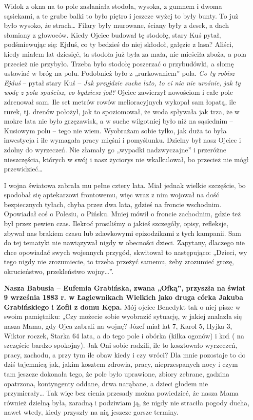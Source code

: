 Widok z okna na to pole zasłaniała stodoła, wysoka, z gumnem i dwoma sąsiekami, a te grube balki to było piętro i jeszcze wyżej to były bunty. To już było wysoko, że strach… Filary były murowane, ściany były z desek, a dach słomiany z głowoców. Kiedy Ojciec budował tę stodołę, stary Kuś pytał, podśmiewując się: Ejduś, co ty bedzieś do niej skłodoł, gałęzie z lasa? Aliści, kiedy miałem lat dziesięć, ta stodoła już była za mała, nie mieściła zboża, a pola przecież nie przybyło. Trzeba było stodołę poszerzać o przybudówki, a słomę ustawiać w bróg na polu. Podobnież było z „rurkowaniem” pola. \textit{Co ty robisz Ejduś} -- pytał stary Kuś – \textit{Jak przyjdzie suche lato, to ci nic nie urośnie, jak ty wodę z pola spuścisz, co bydziesz jod?} Ojciec zawierzył nowościom i całe pole zdrenował sam. Ile set metrów rowów melioracyjnych wykopał sam łopatą, ile rurek, tj. drenów położył, jak to spoziomował, że woda spływała jak trza, że w mokre lata nie było grzęzawisk, a w suche wilgotniej było niż na sąsiednim – Kusiowym polu – tego nie wiem. Wyobrażam sobie tylko, jak duża to była inwestycja i ile wymagała pracy mięśni i pomyślunku. Dzielny był nasz Ojciec i zdolny do wyrzeczeń. Nie złamały go „wypadki nadzwyczajne” i przeróżne nieszczęścia, których w swój i nasz życiorys nie wkalkulował, bo przecież nie mógł przewidzieć…

I wojna światowa zabrała mu pełne cztery lata. Miał jednak wielkie szczęście, bo spodobał się aptekarzowi frontowemu, więc wraz z nim wojował na dość bezpiecznych tyłach, chyba przez dwa lata, gdzieś na froncie wschodnim. Opowiadał coś o Polesiu, o Pińsku. Mniej mówił o froncie zachodnim, gdzie też był przez pewien czas. Ilekroć prosiliśmy o jakieś szczegóły, opisy, refleksje, zbywał nas brakiem czasu lub zdawkowymi epizodzikami z tych kampanii. Sam do tej tematyki nie nawiązywał nigdy w obecności dzieci. Zapytany, dlaczego nie chce opowiadać swych wojennych przygód, skwitował to następująco: „Dzieci, wy tego nigdy nie zrozumiecie, to trzeba przeżyć samemu, żeby zrozumieć grozę, okrucieństwo, przekleństwo wojny…”. 

\textbf{Nasza Babusia – Eufemia Grabińska, zwana „Ofką”, przyszła na świat 9 września 1883 r. w Łagiewnikach Wielkich jako druga córka Jakuba Grabińskiego i Zofii z domu Kępa.} Mój ojciec Benedykt tak o niej pisze w swoim pamiętniku: „Czy możecie sobie wyobrazić sytuację, w jakiej znalazła się nasza Mama, gdy Ojca zabrali na wojnę? Józef miał lat 7, Karol 5, Hyjka 3, Wiktor roczek, Starka 64 lata, a do tego pole i obórka (kilka ogonów) i koń ( na szczęście bardzo spokojny). Jak Oni sobie radzili, ile to kosztowało wyrzeczeń, pracy, zachodu, a przy tym ile obaw kiedy i czy wróci? Dla mnie pozostaje to do dziś tajemnicą jak, jakim kosztem zdrowia, pracy, nieprzespanych nocy i czym tam jeszcze dokonała tego, że pole było uprawione, zbiory zebrane, gadzina opatrzona, kontyngenty oddane, drwa narąbane, a dzieci głodem nie przymierały… Tak więc bez cienia przesady można powiedzieć, że nasza Mama również dzielną była, zaradną i podziwiam ją, że nigdy nie straciła pogody ducha, nawet wtedy, kiedy przyszły na nią jeszcze gorsze terminy. 

